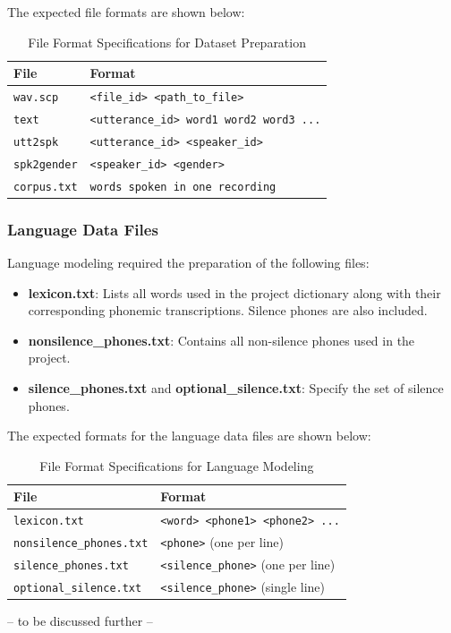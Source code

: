 \vspace{1em}

The expected file formats are shown below:

\begin{table}[H]
\centering
\renewcommand{\arraystretch}{1.3}
\setlength{\tabcolsep}{10pt}
\caption{File Format Specifications for Dataset Preparation}
\label{tab:fileformats}
\begin{tabular}{|l|l|}
\hline
\textbf{File} & \textbf{Format} \\
\hline
\texttt{wav.scp} & \texttt{<file\_id> <path\_to\_file>} \\
\texttt{text} & \texttt{<utterance\_id> word1 word2 word3 ...} \\
\texttt{utt2spk} & \texttt{<utterance\_id> <speaker\_id>} \\
\texttt{spk2gender} & \texttt{<speaker\_id> <gender>} \\
\texttt{corpus.txt} & \texttt{words spoken in one recording} \\
\hline
\end{tabular}
\end{table}

\subsubsection{Language Data Files}

Language modeling required the preparation of the following files:

\begin{itemize}
    \item \textbf{lexicon.txt}: Lists all words used in the project dictionary along with their corresponding phonemic transcriptions. Silence phones are also included.
    \item \textbf{nonsilence\_phones.txt}: Contains all non-silence phones used in the project.
    \item \textbf{silence\_phones.txt} and \textbf{optional\_silence.txt}: Specify the set of silence phones.
\end{itemize}

\vspace{1em}

The expected formats for the language data files are shown below:

\begin{table}[H]
\centering
\renewcommand{\arraystretch}{1.3}
\setlength{\tabcolsep}{10pt}
\caption{File Format Specifications for Language Modeling}
\label{tab:languageformats}
\begin{tabular}{|l|l|}
\hline
\textbf{File} & \textbf{Format} \\
\hline
\texttt{lexicon.txt} & \texttt{<word> <phone1> <phone2> ...} \\
\texttt{nonsilence\_phones.txt} & \texttt{<phone>} (one per line) \\
\texttt{silence\_phones.txt} & \texttt{<silence\_phone>} (one per line) \\
\texttt{optional\_silence.txt} & \texttt{<silence\_phone>} (single line) \\
\hline
\end{tabular}
\end{table}

\vspace{1em}

-- to be discussed further --

